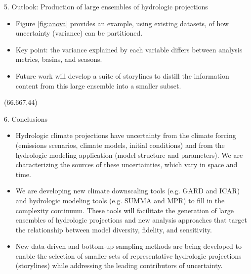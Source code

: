 \documentclass{beamer}
\begin{document}
\begin{frame}{}
\begin{columns}
\begin{column}{.3333\paperwidth}
\begin{textblock}{\textwidth \TPHorizModule}
\begin{block}{5. Outlook: Production of large ensembles of hydrologic projections}
     \begin{itemize}
      \justifying
      \item Figure \ref{fig:anova} provides an example, using existing datasets, of how uncertainty (variance) can be partitioned.
      \item Key point: the variance explained by each variable differs between analysis metrics, basins, and seasons.
      \item Future work will develop a suite of storylines to distill the information content from this large ensemble into a smaller subset.
     \end{itemize}

    \end{block}
   \end{textblock}

   \begin{textblock}{\textwidth \TPHorizModule}(66.667,44)


    \begin{block}{6. Conclusions}

     \vspace{-1cm}
     \begin{shaded}
      \begin{itemize}         \vspace{1cm}
       \justifying
       \item Hydrologic climate projections have uncertainty from the climate forcing (emissions scenarios, climate models, initial conditions) and from the hydrologic modeling application (model structure and parameters). We are characterizing the sources of these uncertainties, which vary in space and time. \vspace{1cm}
       \item We are developing new climate downscaling tools (e.g. GARD and ICAR) and hydrologic modeling tools (e.g. SUMMA and MPR) to fill in the complexity continuum. These tools will facilitate the generation of large ensembles of hydrologic projections and new analysis approaches that target the relationship between model diversity, fidelity, and sensitivity. \vspace{1cm}
       \item New data-driven and bottom-up sampling methods are being developed to enable the selection of smaller sets of representative hydrologic projections (storylines) while addressing the leading contributors of uncertainty. \vspace{1cm}

      \end{itemize}


\end{shaded}
\end{block}
\end{textblock}
\end{column}
\end{columns}
\end{frame}
\end{document}
